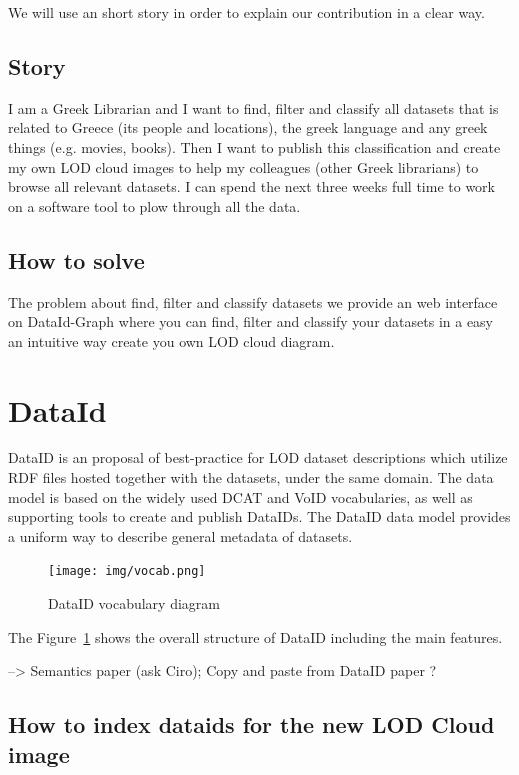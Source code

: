 \documentclass{iosart2c}
\begin{document}
We will use an short story in order to explain our contribution in a clear way.

\subsection{Story} 

I am a Greek Librarian and I want to find, filter and classify all datasets that is related to Greece (its people and locations), the greek language and any greek things (e.g. movies, books). Then I want to publish this classification and create my own LOD cloud images to help my colleagues (other Greek librarians) to browse all relevant datasets. I can spend the next three weeks full time to work on a software tool to plow through all the data.

\subsection{How to solve}
The problem about find, filter and classify datasets we provide an web interface on DataId-Graph where you can find, filter and classify your datasets in a easy an intuitive way create you own LOD cloud diagram.

\section{DataId}

DataID \cite{dataID2014} is an proposal of best-practice for LOD dataset descriptions which utilize RDF files hosted together with the datasets, under the same domain.
The data model is based on the widely used DCAT and VoID vocabularies, as well as supporting tools to create and publish DataIDs.
The DataID data model provides a uniform way to describe general metadata of datasets.

\begin{figure}[tbp] 
  \centering
\texttt{[image: img/vocab.png]}
  \caption{DataID vocabulary diagram}
  \label{fig:vocab}
\end{figure}

The Figure~\ref{fig:vocab} shows the overall structure of DataID including the main features.


--> Semantics paper (ask Ciro);
Copy and paste from DataID paper ?

\subsection{How to index dataids for the new LOD Cloud image}
\end{document}
